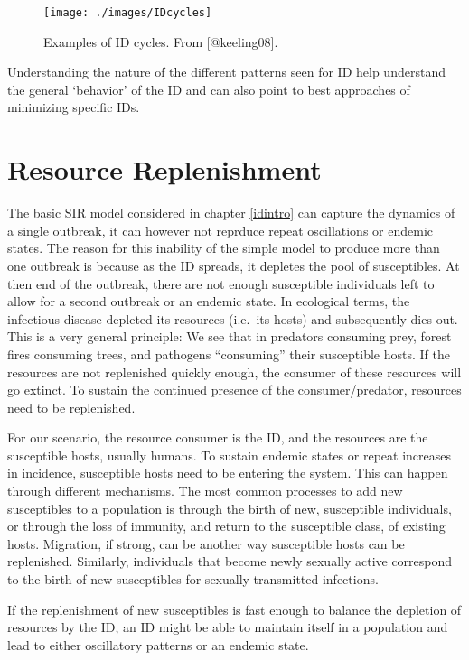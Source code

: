 \documentclass[
]{book}
\begin{document}
\begin{figure}
\texttt{[image: ./images/IDcycles]} \caption{Examples of ID cycles. From [@keeling08].}\label{fig:IDcycles}
\end{figure}

Understanding the nature of the different patterns seen for ID help understand the general `behavior' of the ID and can also point to best approaches of minimizing specific IDs.

\hypertarget{resource-replenishment}{%
\section{Resource Replenishment}\label{resource-replenishment}}

The basic SIR model considered in chapter \ref{idintro} can capture the dynamics of a single outbreak, it can however not reprduce repeat oscillations or endemic states. The reason for this inability of the simple model to produce more than one outbreak is because as the ID spreads, it depletes the pool of susceptibles. At then end of the outbreak, there are not enough susceptible individuals left to allow for a second outbreak or an endemic state. In ecological terms, the infectious disease depleted its resources (i.e.~its hosts) and subsequently dies out. This is a very general principle: We see that in predators consuming prey, forest fires consuming trees, and pathogens ``consuming'' their susceptible hosts. If the resources are not replenished quickly enough, the consumer of these resources will go extinct. To sustain the continued presence of the consumer/predator, resources need to be replenished.

For our scenario, the resource consumer is the ID, and the resources are the susceptible hosts, usually humans. To sustain endemic states or repeat increases in incidence, susceptible hosts need to be entering the system. This can happen through different mechanisms. The most common processes to add new susceptibles to a population is through the birth of new, susceptible individuals, or through the loss of immunity, and return to the susceptible class, of existing hosts. Migration, if strong, can be another way susceptible hosts can be replenished. Similarly, individuals that become newly sexually active correspond to the birth of new susceptibles for sexually transmitted infections.

If the replenishment of new susceptibles is fast enough to balance the depletion of resources by the ID, an ID might be able to maintain itself in a population and lead to either oscillatory patterns or an endemic state.
\end{document}
